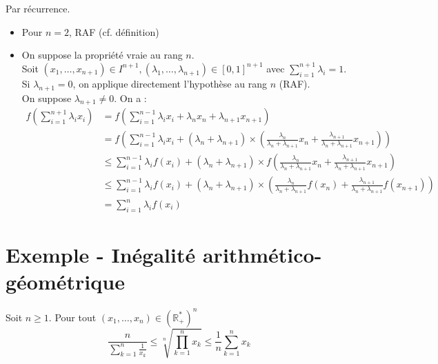 \documentclass[../main.tex]{subfiles}
\begin{document}
\noindent Par récurrence. 
\begin{itemize}
    \item Pour $n = 2$, RAF (cf. définition)
    \item On suppose la propriété vraie au rang $n$. \\
    Soit $(x_1, \ldots, x_{n+1}) \in I^{n+1}, (\lambda_1, \ldots, \lambda_{n+1}) \in [0, 1]^{n+1}$ avec $\sum\limits_{i=1}^{n+1} \lambda_i = 1$. \\
    Si $\lambda_{n+1} = 0$, on applique directement l'hypothèse au rang $n$ (RAF). \\
    On suppose $\lambda_{n+1} \neq 0$. On a : 
    \begin{align*}
        f \left( \sum_{i=1}^{n+1} \lambda_i x_i \right) &= f \left( \sum_{i=1}^{n-1} \lambda_i x_i + \lambda_n x_n + \lambda_{n+1}x_{n+1} \right) \\
        &= f \left( \sum_{i=1}^{n-1} \lambda_i x_i + (\lambda_n + \lambda_{n+1}) \times \left( \frac{\lambda_n}{\lambda_n + \lambda_{n+1}}x_n + \frac{\lambda_{n+1}}{\lambda_n + \lambda_{n+1}}x_{n+1} \right) \right) \\
        &\leq \sum_{i=1}^{n-1} \lambda_i f(x_i) + (\lambda_n + \lambda_{n+1}) \times f\left( \frac{\lambda_n}{\lambda_n + \lambda_{n+1}}x_n + \frac{\lambda_{n+1}}{\lambda_n + \lambda_{n+1}}x_{n+1} \right) \\
        &\leq \sum_{i=1}^{n-1} \lambda_i f(x_i) + (\lambda_n + \lambda_{n+1}) \times \left( \frac{\lambda_n}{\lambda_n + \lambda_{n+1}}f(x_n) + \frac{\lambda_{n+1}}{\lambda_n + \lambda_{n+1}}f(x_{n+1}) \right) \\
        &= \sum_{i=1}^{n} \lambda_i f(x_i)
    \end{align*}
\end{itemize}

\section{Exemple - Inégalité arithmético-géométrique}
\begin{tcolorbox}[title=Exemple 19.25, title filled=false, colframe=darkgreen, colback=darkgreen!10!white]
    Soit $n \geq 1$. Pour tout $(x_1, \ldots, x_n) \in (\mathbb{R}_+^*)^n$
    $$\frac{n}{\sum\limits_{k=1}^{n} \frac{1}{x_k}} \leq \sqrt[n]{\prod_{k=1}^{n} x_k} \leq \frac{1}{n}\sum_{k=1}^{n} x_k$$
\end{tcolorbox}
\end{document}
